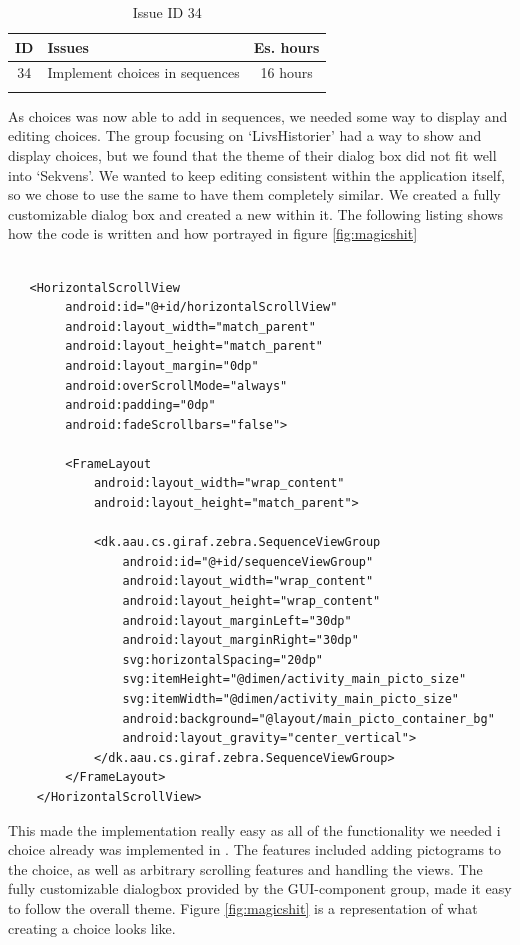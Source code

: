 \begin{longtable} { | c | p{12cm} | c | } 
\hline
	ID 	&	Issues	&		 Es. hours \\\hline
	34 	&	Implement choices in sequences	&	16 hours \\\hline
\caption{Issue ID 34}
\label{tab:spr3_choicesinsequences}
\end{longtable}

As choices was now able to add in sequences, we needed some way to display and editing choices.  The group focusing on `LivsHistorier' had a way to show and display choices, but we found that the theme of their dialog box did not fit well into `Sekvens'. We wanted to keep editing consistent within the application itself, so we chose to use the same  to have them completely similar. We created a fully customizable dialog box and created a new  within it. The following listing shows how the code is written and how portrayed in figure \ref{fig:magicshit}

\begin{lstlisting}

   <HorizontalScrollView
        android:id="@+id/horizontalScrollView"
        android:layout_width="match_parent"
        android:layout_height="match_parent"
        android:layout_margin="0dp"
        android:overScrollMode="always"
        android:padding="0dp"
        android:fadeScrollbars="false">

        <FrameLayout
            android:layout_width="wrap_content"
            android:layout_height="match_parent">

            <dk.aau.cs.giraf.zebra.SequenceViewGroup
                android:id="@+id/sequenceViewGroup"
                android:layout_width="wrap_content"
                android:layout_height="wrap_content"
                android:layout_marginLeft="30dp"
                android:layout_marginRight="30dp"
                svg:horizontalSpacing="20dp"
                svg:itemHeight="@dimen/activity_main_picto_size"
                svg:itemWidth="@dimen/activity_main_picto_size"
                android:background="@layout/main_picto_container_bg"
                android:layout_gravity="center_vertical">
            </dk.aau.cs.giraf.zebra.SequenceViewGroup>
        </FrameLayout>
    </HorizontalScrollView>

\end{lstlisting}

This made the implementation really easy as all of the functionality we needed i choice already was implemented in . The features included adding pictograms to the choice, as well as arbitrary scrolling features and handling the views. The fully customizable dialogbox provided by the GUI-component group, made it easy to follow the overall theme. Figure \ref{fig:magicshit} is a representation of what creating a choice looks like.

